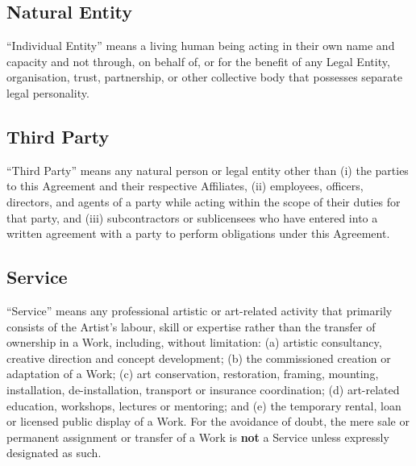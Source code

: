 \subsection{Natural Entity}
\enquote{Individual Entity} means a living human being acting in their own name 
and capacity and not through, on behalf of, or for the benefit of any Legal 
Entity, organisation, trust, partnership, or other collective body that
possesses separate legal personality.


\subsection{Third Party}
\enquote{Third Party} means any natural person or legal entity
other than 
(i) the parties to this Agreement and their respective Affiliates,
(ii) employees, officers, directors, and agents of a party while acting
within the scope of their duties for that party, and
(iii) subcontractors or sublicensees who have entered into a written agreement
with a party to perform obligations under this Agreement.


\subsection{Service}
\enquote{Service} means any professional artistic or art-related activity that
primarily consists of the Artist's labour, skill or expertise rather than the
transfer of ownership in a Work, including, without limitation: \newline 
(a) artistic consultancy, creative direction and concept development;
(b) the commissioned creation or adaptation of a Work;
(c) art conservation, restoration, framing, mounting, installation,
    de-installation, transport or insurance coordination;
(d) art-related education, workshops, lectures or mentoring; and
(e) the temporary rental, loan or licensed public display of a Work.
For the avoidance of doubt, the mere sale or permanent assignment or transfer of 
a Work is \textbf{not} a Service unless expressly designated as such.
